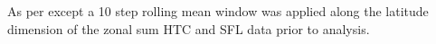 \label{fig:csiro_supp}
As per \label{fig:csiro} except a 10 step rolling mean window was applied along the latitude dimension of the zonal sum HTC and SFL data prior to analysis. 